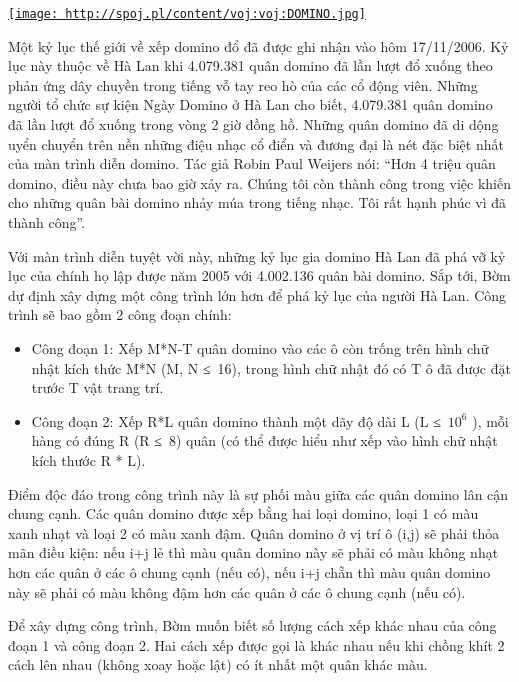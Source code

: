 



\href{../../../../embed/voj:voj:DOMINO.jpg}{
\texttt{[image: http://spoj.pl/content/voj:voj:DOMINO.jpg]}}

   Một kỷ lục thế giới về xếp domino đổ đã được ghi nhận vào hôm 17/11/2006. Kỷ lục này thuộc về Hà Lan khi 4.079.381 quân domino đã lần lượt đổ xuống theo phản ứng dây chuyền trong tiếng vỗ tay reo hò của các cổ động viên. Những người tổ chức sự kiện Ngày Domino ở Hà Lan cho biết, 4.079.381 quân domino đã lần lượt đổ xuống trong vòng 2 giờ đồng hồ. Những quân domino đã di dộng uyển chuyển trên nền những điệu nhạc cổ điển và đương đại là nét đặc biệt nhất của màn trình diễn domino. Tác giả Robin Paul Weijers nói: “Hơn 4 triệu quân domino, điều này chưa bao giờ xảy ra. Chúng tôi còn thành công trong việc khiến cho những quân bài domino nhảy múa trong tiếng nhạc. Tôi rất hạnh phúc vì đã thành công”.  

   Với màn trình diễn tuyệt vời này, những kỷ lục gia domino Hà Lan đã phá vỡ kỷ lục của chính họ lập được năm 2005 với 4.002.136 quân bài domino. Sắp tới, Bờm dự định xây dựng một công trình lớn hơn để phá kỷ lục của người Hà Lan. Công trình sẽ bao gồm 2 công đoạn chính:  
\begin{itemize}
	\item     Công đoạn 1: Xếp M*N-T quân domino vào các ô còn trống trên hình chữ nhật kích thức M*N (M, N ≤ 16), trong hình chữ nhật đó có T ô đã được đặt trước T vật trang trí.   
	\item     Công đoạn 2: Xếp R*L quân domino thành một dãy độ dài L (L ≤ $10^{6}$    ), mỗi hàng có đúng R (R ≤ 8) quân (có thể được hiểu như xếp vào hình chữ nhật kích thước R * L).   
\end{itemize}

   Điểm độc đáo trong công trình này là sự phối màu giữa các quân domino lân cận chung cạnh. Các quân domino được xếp bằng hai loại domino, loại 1 có màu xanh nhạt và loại 2 có màu xanh đậm. Quân domino ở vị trí ô (i,j) sẽ phải thỏa mãn điều kiện: nếu i+j lẻ thì màu quân domino này sẽ phải có màu không nhạt hơn các quân ở các ô chung cạnh (nếu có), nếu i+j chẵn thì màu quân domino này sẽ phải có màu không đậm hơn các quân ở các ô chung cạnh (nếu có).  

   Để xây dựng công trình, Bờm muốn biết số lượng cách xếp khác nhau của công đoạn 1 và công đoạn 2. Hai cách xếp được gọi là khác nhau nếu khi chồng khít 2 cách lên nhau (không xoay hoặc lật) có ít nhất một quân khác màu.  

